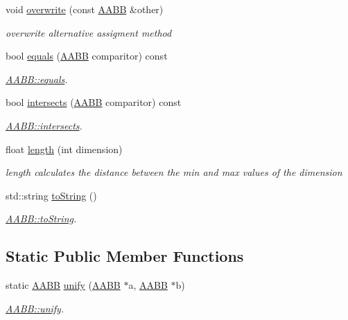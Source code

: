 \begin{DoxyCompactItemize}
void \hyperlink{class_a_a_b_b_a596eee6cf349fa4c1d95e42925a791e5}{overwrite} (const \hyperlink{class_a_a_b_b}{A\+A\+BB} \&other)
\begin{DoxyCompactList}\small\item\em overwrite alternative assigment method \end{DoxyCompactList}\item 
bool \hyperlink{class_a_a_b_b_a11c212defb35c26aa0ffb3d3ae75d93a}{equals} (\hyperlink{class_a_a_b_b}{A\+A\+BB} comparitor) const
\begin{DoxyCompactList}\small\item\em \hyperlink{class_a_a_b_b_a11c212defb35c26aa0ffb3d3ae75d93a}{A\+A\+B\+B\+::equals}. \end{DoxyCompactList}\item 
bool \hyperlink{class_a_a_b_b_a62290d3f27644484f2df17c42cd1bfd5}{intersects} (\hyperlink{class_a_a_b_b}{A\+A\+BB} comparitor) const
\begin{DoxyCompactList}\small\item\em \hyperlink{class_a_a_b_b_a62290d3f27644484f2df17c42cd1bfd5}{A\+A\+B\+B\+::intersects}. \end{DoxyCompactList}\item 
float \hyperlink{class_a_a_b_b_a5fc1c7199d86d67257d2746cf4ce0bf2}{length} (int dimension)
\begin{DoxyCompactList}\small\item\em length calculates the distance between the min and max values of the dimension \end{DoxyCompactList}\item 
std\+::string \hyperlink{class_a_a_b_b_af66da47bd15d679936e05af231b45b75}{to\+String} ()
\begin{DoxyCompactList}\small\item\em \hyperlink{class_a_a_b_b_af66da47bd15d679936e05af231b45b75}{A\+A\+B\+B\+::to\+String}. \end{DoxyCompactList}\end{DoxyCompactItemize}
\subsection*{Static Public Member Functions}
\begin{DoxyCompactItemize}
\item 
static \hyperlink{class_a_a_b_b}{A\+A\+BB} \hyperlink{class_a_a_b_b_a30a3b5591ad161fe88f9aaf51cf3da64}{unify} (\hyperlink{class_a_a_b_b}{A\+A\+BB} $\ast$a, \hyperlink{class_a_a_b_b}{A\+A\+BB} $\ast$b)
\begin{DoxyCompactList}\small\item\em \hyperlink{class_a_a_b_b_a30a3b5591ad161fe88f9aaf51cf3da64}{A\+A\+B\+B\+::unify}. \end{DoxyCompactList}\end{DoxyCompactItemize}
